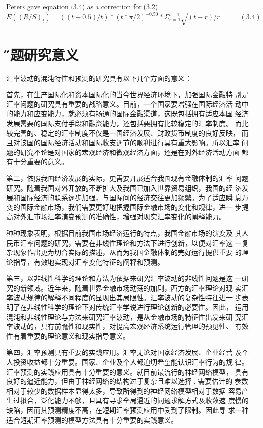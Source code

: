 \documentclass[12pt]{article}
\begin{document}
Peters gave equation (3.4) as a correction for (3.2)
$$E((R/S)_t)=((t-0.5)/t)*(t*\pi/2)^{-0.50}*\Sigma_{r=1}^{t-1}\sqrt{(t-r)/r}        ~~~~~~~~~~~~~(3.4)$$

\section{\H 课题研究意义}
汇率波动的混沌特性和预测的研究具有以下几个方面的意义：
 
首先，在生产国际化和资本国际化的当今世界经济环境下，加强国际金融特
别是汇率问题的研究具有重要的战略意义。目前，一个国家要增强在国际经济活
动中的能力和应变能力，就必须有畅通的国际金融渠道，这既包括拥有适应本国
经济发展需要的国际支付手段和融资能力，还包括要拥有比较稳定的汇率制度。
而比较完善的、稳定的汇率制度不仅是一国经济发展、财政货币制度的良好反映，
而且对该国的国际经济活动和国际收支调节的顺利进行具有重大影响。所以汇率
问题的研究不论是对国家的宏观经济和微观经济方面，还是在对外经济活动方面
都有十分重要的意义。
 
第二，依照我国经济发展的实际，更需要开展适合我国现有金融体制的汇率
问题研究。随着我国对外开放的不断扩大及我国已加入世界贸易组织，我国的经
济发展和国际经济的联系逐步加强，与国际间的经济交往更加频繁。为了适应瞬
息万变的国际金融市场，我们需要更好地把握国际金融市场的变化和规律，进一
步提高对外汇市场汇率演变预测的准确性，增强对现实汇率变化的阐释能力。
 
种种现象表明，根据目前我国市场经济运行的特点，我国金融市场的演变及
其人民币汇率问题的研究，需要在非线性理论和方法下进行创新，以便对汇率这
一复杂现象作出更为切合实际的描述，从而为我国金融体制的完好运行提供重要
的理论指导，有效地实现对汇率变化特征的阐释和预测。
 
第三，以非线性科学的理论和方法为依据来研究汇率波动的非线性问题是这
一研究的新领域。近年来，随着世界金融市场动荡的加剧，西方的汇率理论对现
实汇率波动规律的解释不同程度的显现出其局限性。汇率波动的复杂性特征进一
步表明了在非线性科学的理论下对传统汇率学说进行理论创新的必要性。因此，
运用混沌和非线性理论与方法来研究汇率波动，是从金融市场的特征性出发来研
究汇率波动的，具有前瞻性和现实性，对提高宏观经济系统运行管理的预见性、
有效性有着重要的理论意义和现实指导意义。
 
第四，汇率预测具有重要的实践应用。汇率无论对国家经济发展、企业经营
及个人投资收益都十分重要。国家、企业及个人都迫切希望能认识汇率行为的规
律。汇率预测的实践应用具有十分重要的意义。就目前最流行的神经网络模型，
具有良好的逼近能力，但由于神经网络的结构过于复杂且难以选择
,
需要估计的
参数相对于较少的数据样本显得太多，导致所得到的神经网络模型相对于数据
容易产生过拟合，泛化能力不够，且具有寻求全局逼近的问题求解方式及收敛速
度慢的缺陷，因而其预测精度不高，在短期汇率预测应用中受到了限制。因此寻
求一种适合短期汇率预测的模型方法具有十分重要的实践意义。
 
\end{document}

